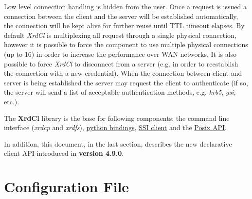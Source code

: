 \documentclass{article}
\begin{document}
	Low level connection handling is hidden from the user. Once a request is issued a connection between the client and the server will 
	be established automatically, the connection will be kept alive for further reuse until TTL timeout elapses. By default \textit{XrdCl} 
	is multiplexing all request through a single physical connection, however it is possible to force the component to use multiple physical 
	connections (up to 16) in order to increase the performance over WAN networks. It is also possible to force \textit{XrdCl} to disconnect
	from a server (e.g. in order to reestablish the connection with a new credential). When the connection between client and server is 
	being established the server may request the client to authenticate (if so, the server will send a list of acceptable authentication 
	methods, e.g. \textit{krb5}, \textit{gsi}, etc.).

	The \textbf{XrdCl} library is the base for following components: the command line interface (\textit{xrdcp} and \textit{xrdfs}), 
	\href{http://xrootd.org/doc/python/xrootd-python/}{python bindings}, \href{http://xrootd.org/doc/dev49/ssi_reference-V2.htm}{SSI client} 
	and the \href{http://xrootd.org/doc/dev49/pss_config.htm#_Toc525070693}{Posix API}.
	
	In addition, this document, in the last section, describes the new declarative client API introduced in \textbf{version 4.9.0}.

\section{Configuration File}
\end{document}
